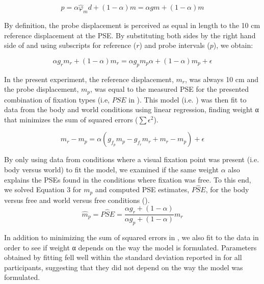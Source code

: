 \begin{equation}
\label{p3:eq2}
p = \alpha \hat{\varphi}_m d + (1 - \alpha) m = \alpha g m + (1 - \alpha) m
\end{equation}

By definition, the probe displacement is perceived as equal in length to the 10 \si{\centi\metre} reference displacement at the PSE. By substituting both sides by the right hand side of  and using subscripts for reference ($r$) and probe intervals ($p$), we obtain:

\begin{equation}
\label{p3:eq3}
\alpha g_r m_r + (1 - \alpha) m_r = \alpha  g_p m_p \alpha + (1 - \alpha) m_p + \epsilon
\end{equation}

In the present experiment, the reference displacement, $m_r$, was always 10 \si{\centi\metre} and the probe displacement, $m_p$, was equal to the measured PSE for the presented combination of fixation types (i.e, $PSE$ in ). This model (i.e. ) was then fit to data from the body and world conditions using linear regression, finding weight α that minimizes the sum of squared errors ($\sum{\epsilon^2}$).

\begin{equation}
\label{p3:eq4}
m_r - m_p = \alpha(g_{f_p} m_p - g_{f_r} m_r + m_r - m_p) + \epsilon
\end{equation}

By only using data from conditions where a visual fixation point was present (i.e. body versus world) to fit the model, we examined if the same weight $\alpha$ also explains the PSEs found in the conditions where fixation was free. To this end, we solved Equation 3 for $m_p$ and computed PSE estimates, $P\hat{S}E$, for the body versus free and world versus free conditions ().
                                                                                            \begin{equation}
\label{p3:eq5}
\hat{m}_p = P\hat{S}E = \frac
	{\alpha g_r + (1 - \alpha)}
	{\alpha g_p + (1 - \alpha)}
    m_r
\end{equation}

In addition to minimizing the sum of squared errors in , we also fit  to the data in order to see if weight α depends on the way the model is formulated. Parameters obtained by fitting  fell well within the standard deviation reported in  for all participants, suggesting that they did not depend on the way the model was formulated.
